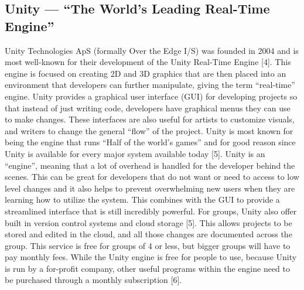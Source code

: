\documentclass[onecolumn, draftclsnofoot,10pt, compsoc]{IEEEtran}
\begin{document}
\subsection{Unity –-- ``The World's Leading Real-Time Engine''}
Unity Technologies ApS (formally Over the Edge I/S) was founded in 2004 and is most well-known for their development of the Unity Real-Time Engine [4]. This engine is focused on creating 2D and 3D graphics that are then placed into an environment that developers can further manipulate, giving the term ``real-time'' engine. Unity provides a graphical user interface (GUI) for developing projects so that instead of just writing code, developers have graphical menus they can use to make changes. These interfaces are also useful for artists to customize visuals, and writers to change the general ``flow'' of the project. Unity is most known for being the engine that runs ``Half of the world's games'' and for good reason since Unity is available for every major system available today [5].
\newline
\newline
Unity is an ``engine'', meaning that a lot of overhead is handled for the developer behind the scenes. This can be great for developers that do not want or need to access to low level changes and it also helps to prevent overwhelming new users when they are learning how to utilize the system. This combines with the GUI to provide a streamlined interface that is still incredibly powerful. For groups, Unity also offer built in version control systems and cloud storage [5]. This allows projects to be stored and edited in the cloud, and all those changes are documented across the group. This service is free for groups of 4 or less, but bigger groups will have to pay monthly fees. While the Unity engine is free for people to use, because Unity is run by a for-profit company, other useful programs within the engine need to be purchased through a monthly subscription [6]. 
\end{document}
